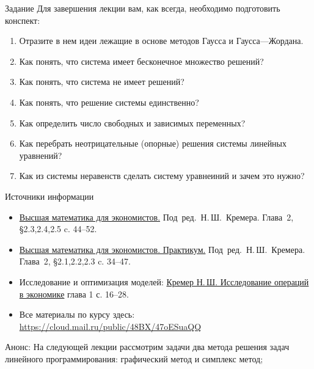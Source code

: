 \documentclass[unicode,11pt,notheorems]{beamer}
\begin{document}
\begin{frame}{Задание}
Для завершения лекции вам, как всегда, необходимо подготовить конспект:
	\begin{enumerate}
		\item 
			Отразите в нем идеи лежащие в основе методов Гаусса и Гаусса---Жордана.
		\item 
			Как понять, что система имеет бесконечное множество решений?
		\item 
			Как понять, что система не имеет решений?
		\item 
			Как понять, что решение системы единственно?
		\item 
			Как определить число свободных и зависимых переменных?
		\item 
			Как перебрать неотрицательные (опорные) решения системы линейных уравнений?
		\item 
			Как из системы неравенств сделать систему уравнеиний и зачем это нужно?
	\end{enumerate}
\end{frame}
\begin{frame}{Источники информации}
\begin{itemize}
\item 
	{\color{blue}\href{https://cloud.mail.ru/public/jWCR/2BBwXTrkg}{Высшая математика для экономистов.}} Под~ред.~Н.\,Ш.~Кремера. Глава~2, \S 2.3,2.4,2.5 c. 44--52.
\item 
	{\color{blue}\href{https://cloud.mail.ru/public/5c87/4Cmo8H9BA}{Высшая математика для экономистов. Практикум.}} Под~ред.~Н.\,Ш.~Кремера.  Глава~2, \S 2.1,2.2,2.3 c. 34--47.
\item 
	Исследование и оптимизация моделей:  {\color{blue}\href{https://cloud.mail.ru/public/4SN3/2MJYgEz95}{Кремер  Н.\,Ш. Исследование операций в экономике}} глава 1 с. 16--28.

\item 
	Все материалы по курсу здесь:
{\color{blue}\url{https://cloud.mail.ru/public/48BX/47oESuaQQ}}
\end{itemize}

\end{frame}

\begin{frame}{Анонс:}
	На следующей лекции рассмотрим задачи два метода решения задач линейного программирования: графический метод и симплекс метод;

\end{frame}
\end{document}
